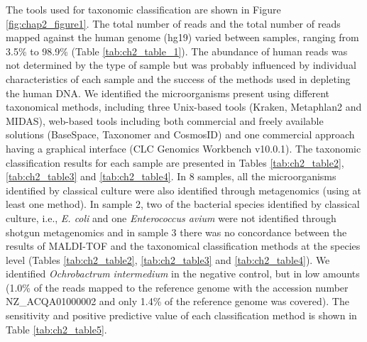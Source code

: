 The tools used for taxonomic classification are shown in Figure \ref{fig:chap2_figure1}. 
The total number of reads and the total number of reads mapped against the human genome (hg19) varied between samples, ranging from 3.5\% to 98.9\% (Table \ref{tab:ch2_table_1}). 
The abundance of human reads was not determined by the type of sample but was probably influenced by individual characteristics of each sample and the success of the methods used in depleting the human DNA. 
We identified the microorganisms present using different taxonomical methods, including three Unix-based tools (Kraken, Metaphlan2 and MIDAS), web-based tools including both commercial and freely available solutions (BaseSpace, Taxonomer and CosmosID) and one commercial approach having a graphical interface (CLC Genomics Workbench v10.0.1). 
The taxonomic classification results for each sample are presented in Tables \ref{tab:ch2_table2}, \ref{tab:ch2_table3} and \ref{tab:ch2_table4}. 
In 8 samples, all the microorganisms identified by classical culture were also identified through metagenomics (using at least one method). 
In sample 2, two of the bacterial species identified by classical culture, i.e., \textit{E. coli} and one \textit{Enterococcus avium} were not identified through shotgun metagenomics and in sample 3 there was no concordance between the results of MALDI-TOF and the taxonomical classification methods at the species level (Tables \ref{tab:ch2_table2}, \ref{tab:ch2_table3} and \ref{tab:ch2_table4}).
We identified \textit{Ochrobactrum intermedium} in the negative control, but in low amounts (1.0\% of the reads mapped to the reference genome with the accession number NZ\_ACQA01000002 and only 1.4\% of the reference genome was covered). 
The sensitivity and positive predictive value of each classification method is shown in Table \ref{tab:ch2_table5}.

